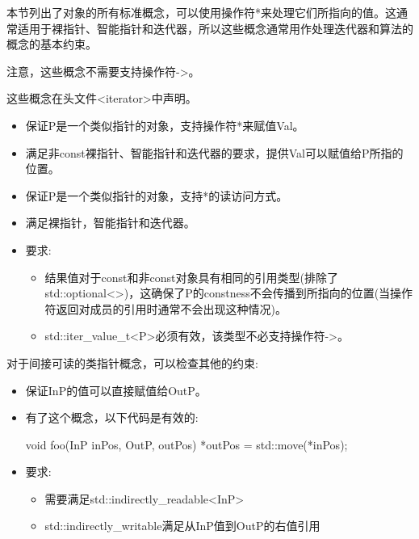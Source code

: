 
本节列出了对象的所有标准概念，可以使用操作符*来处理它们所指向的值。这通常适用于裸指针、智能指针和迭代器，所以这些概念通常用作处理迭代器和算法的概念的基本约束。

注意，这些概念不需要支持操作符->。

这些概念在头文件<iterator>中声明。




\begin{itemize}
\item
保证P是一个类似指针的对象，支持操作符*来赋值Val。
	
\item
满足非const裸指针、智能指针和迭代器的要求，提供Val可以赋值给P所指的位置。
\end{itemize}



\begin{itemize}
\item
保证P是一个类似指针的对象，支持*的读访问方式。

\item
满足裸指针，智能指针和迭代器。


\item
要求:
\begin{itemize}
\item
结果值对于const和非const对象具有相同的引用类型(排除了std::optional<>)，这确保了P的constness不会传播到所指向的位置(当操作符返回对成员的引用时通常不会出现这种情况)。

\item
std::iter\_value\_t<P>必须有效，该类型不必支持操作符->。
\end{itemize}
\end{itemize}


对于间接可读的类指针概念，可以检查其他的约束:


\begin{itemize}
\item
保证InP的值可以直接赋值给OutP。

\item
有了这个概念，以下代码是有效的:

\begin{cpp}
void foo(InP inPos, OutP, outPos) {
	*outPos = std::move(*inPos);
}
\end{cpp}

\item
要求:
\begin{itemize}
\item
需要满足std::indirectly\_readable<InP>

\item
std::indirectly\_writable满足从InP值到OutP的右值引用
\end{itemize}
\end{itemize}

